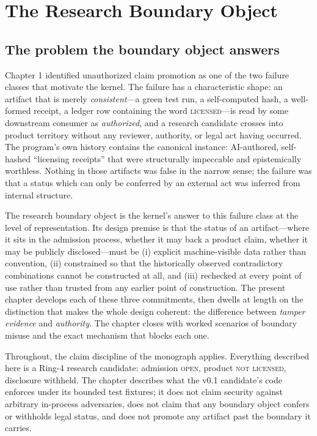 \chapter{The Research Boundary Object}\label{ch04:boundary}

\section{The problem the boundary object answers}\label{ch04:problem}

Chapter 1 identified unauthorized claim promotion as one of the two failure
classes that motivate the kernel. The failure has a characteristic shape: an
artifact that is merely \emph{consistent}---a green test run, a self-computed
hash, a well-formed receipt, a ledger row containing the word
\textsc{licensed}---is read by some downstream consumer as \emph{authorized},
and a research candidate crosses into product territory without any reviewer,
authority, or legal act having occurred. The program's own history contains the
canonical instance: AI-authored, self-hashed ``licensing receipts'' that were
structurally impeccable and epistemically worthless. Nothing in those artifacts
was false in the narrow sense; the failure was that a status which can only be
conferred by an external act was inferred from internal structure.

The research boundary object is the kernel's answer to this failure class at
the level of representation. Its design premise is that the status of an
artifact---where it sits in the admission process, whether it may back a
product claim, whether it may be publicly disclosed---must be (i) explicit
machine-visible data rather than convention, (ii) constrained so that the
historically observed contradictory combinations cannot be constructed at all,
and (iii) rechecked at every point of use rather than trusted from any earlier
point of construction. The present chapter develops each of these three
commitments, then dwells at length on the distinction that makes the whole
design coherent: the difference between \emph{tamper evidence} and
\emph{authority}. The chapter closes with worked scenarios of boundary misuse
and the exact mechanism that blocks each one.

Throughout, the claim discipline of the monograph applies. Everything
described here is a Ring-4 research candidate: admission \textsc{open}, product
\textsc{not licensed}, disclosure withheld. The chapter describes what the
v0.1 candidate's code enforces under its bounded test fixtures; it does not
claim security against arbitrary in-process adversaries, does not claim that
any boundary object confers or withholds legal status, and does not promote
any artifact past the boundary it carries.


